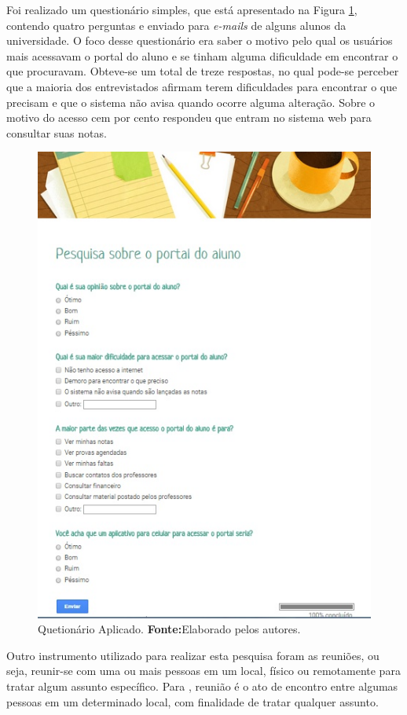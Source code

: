 	\par Foi realizado um questionário simples, que está apresentado na Figura
\ref{fig:qm1}, contendo quatro perguntas e enviado para \textit{e-mails} de
alguns alunos da universidade. O foco desse questionário era saber o motivo pelo qual
os usuários mais acessavam o portal do aluno e se tinham alguma dificuldade em
encontrar o que procuravam. Obteve-se um total de treze respostas, no qual
pode-se perceber que a maioria dos entrevistados afirmam terem dificuldades
para encontrar o que precisam e que o sistema não avisa quando ocorre alguma
alteração. Sobre o motivo do acesso cem por cento respondeu que entram no
sistema web para consultar suas notas.
\pagebreak
\begin{figure}[h!]
	\centerline{\includegraphics[scale=0.5]{./imagens/2_q_metodologico/qm1.png}}
	\caption[Quetionário Aplicado]{Quetionário Aplicado.
		\textbf{Fonte:}Elaborado pelos autores.}
	\label{fig:qm1}
\end{figure}
	

	\par Outro instrumento utilizado para realizar esta pesquisa foram as
reuniões, ou seja, reunir-se com uma ou mais pessoas em um local, físico ou
remotamente para tratar algum assunto específico. Para
, reunião é o ato de encontro entre algumas pessoas em
um determinado local, com finalidade de tratar qualquer assunto.

